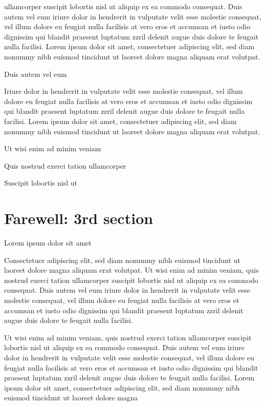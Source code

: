 \documentclass[11pt,twoside]{article}\makeatletter
\makeatletter
\renewcommand\section{\@startsection {section}{1}{\z@}%
     {-1.75ex \@plus -0.5ex \@minus -.2ex}%
     {0.5ex \@plus .2ex}%
     {\reset@font\Large\bfseries\sffamily}}
\def\DivI{\section}
\def\DivI{\chapter}
\makeatother
\begin{document}
      ullamcorper suscipit lobortis nisl ut aliquip ex ea commodo
      consequat. Duis autem vel eum iriure dolor in hendrerit in vulputate
      velit esse molestie consequat, vel illum dolore eu feugiat nulla
      facilisis at vero eros et accumsan et iusto odio dignissim qui blandit
      praesent luptatum zzril delenit augue duis dolore te feugait nulla
      facilisi. Lorem ipsum dolor sit amet, consectetuer adipiscing elit,
      sed diam nonummy nibh euismod tincidunt ut laoreet dolore magna
      aliquam erat volutpat. \par Duis autem vel eum \par Iriure dolor in hendrerit in vulputate velit esse molestie
      consequat, vel illum dolore eu feugiat nulla facilisis at vero eros et
      accumsan et iusto odio dignissim qui blandit praesent luptatum zzril
      delenit augue duis dolore te feugait nulla facilisi. Lorem ipsum dolor
      sit amet, consectetuer adipiscing elit, sed diam nonummy nibh euismod
      tincidunt ut laoreet dolore magna aliquam erat volutpat. \par Ut wisi enim ad minim veniam\par Quis nostrud exerci tation ullamcorper \par Suscipit lobortis nisl ut 
\DivI[Farewell: 3rd section]{Farewell: 3rd section}\label{part3}\par Lorem ipsum dolor sit amet\par Consectetuer adipiscing elit, sed diam nonummy nibh euismod
      tincidunt ut laoreet dolore magna aliquam erat volutpat. Ut wisi enim
      ad minim veniam, quis nostrud exerci tation ullamcorper suscipit
      lobortis nisl ut aliquip ex ea commodo consequat. Duis autem vel eum
      iriure dolor in hendrerit in vulputate velit esse molestie consequat,
      vel illum dolore eu feugiat nulla facilisis at vero eros et accumsan
      et iusto odio dignissim qui blandit praesent luptatum zzril delenit
      augue duis dolore te feugait nulla facilisi.\par Ut wisi enim ad minim veniam, quis nostrud exerci tation
      ullamcorper suscipit lobortis nisl ut aliquip ex ea commodo
      consequat. Duis autem vel eum iriure dolor in hendrerit in vulputate
      velit esse molestie consequat, vel illum dolore eu feugiat nulla
      facilisis at vero eros et accumsan et iusto odio dignissim qui blandit
      praesent luptatum zzril delenit augue duis dolore te feugait nulla
      facilisi. Lorem ipsum dolor sit amet, consectetuer adipiscing elit,
      sed diam nonummy nibh euismod tincidunt ut laoreet dolore magna
\end{document}
